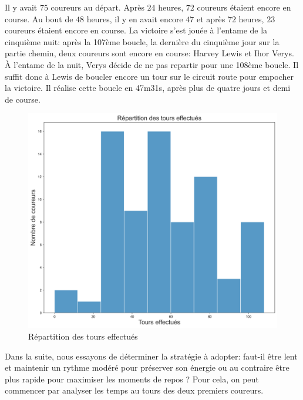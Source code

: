 \documentclass[a4paper,12pt]{article}
\begin{document}
%	

\medskip
Il y avait $75$ coureurs au départ. Après $24$ heures, $72$ coureurs étaient encore en course. Au bout de $48$ heures, il y en avait encore $47$ et après $72$ heures, $23$ coureurs étaient encore en course. La victoire s'est jouée à l'entame de la cinquième nuit: après la 107ème boucle, la dernière du cinquième jour sur la partie chemin, deux coureurs sont encore en course: Harvey Lewis et Ihor Verys. À l'entame de la nuit, Verys décide de ne pas repartir pour une 108ème boucle. Il suffit donc à Lewis de boucler encore un tour sur le circuit route pour empocher la victoire. Il réalise cette boucle en 47m31s, après plus de quatre jours et demi de course.

\begin{figure}[!h]
	
	\includegraphics[scale=0.3]{histogram}
	\centering
	\caption{Répartition des tours effectués}
\end{figure}
\medskip
Dans la suite, nous essayons de déterminer la stratégie à adopter: faut-il être lent et maintenir un rythme modéré pour préserver son énergie ou au contraire être plus rapide pour maximiser les moments de repos ? Pour cela, on peut commencer par analyser les temps au tours des deux premiers coureurs.
\end{document}
